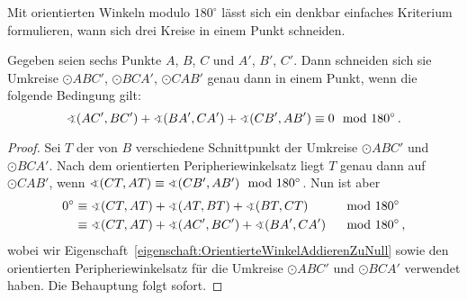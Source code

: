 Mit orientierten Winkeln modulo $180^\circ$ lässt sich ein denkbar einfaches Kriterium formulieren, wann sich drei Kreise in einem Punkt schneiden. %
\begin{satzmitnamen}[Lemma]
	Gegeben seien sechs Punkte $A$, $B$, $C$ und $A'$, $B'$, $C'$. Dann schneiden sich sie Umkreise $\odot ABC'$, $\odot BCA'$, $\odot CAB'$ genau dann in einem Punkt, wenn die folgende Bedingung gilt:
	\begin{equation*}
		\winkel(AC',BC') + \winkel (BA',CA') + \winkel(CB', AB')\equiv 0 \mod 180^\circ\,.
	\end{equation*}
\end{satzmitnamen}

\begin{proof}
	Sei $T$ der von $B$ verschiedene Schnittpunkt der Umkreise $\odot ABC'$ und $\odot BCA'$. Nach dem orientierten Peripheriewinkelsatz liegt $T$ genau dann auf $\odot CAB'$, wenn $\winkel(CT,AT)\equiv\winkel (CB',AB') \mod 180^\circ$. Nun ist aber
	\begin{alignat*}{2}
		0^\circ&\equiv \winkel(CT,AT) +\winkel(AT,BT) + \winkel(BT,CT) &&\mod 180^\circ\\
		&\equiv \winkel(CT,AT) + \winkel(AC',BC') + \winkel(BA',CA') &&\mod 180^\circ\,,
	\end{alignat*}
	wobei wir Eigenschaft~\ref{eigenschaft:OrientierteWinkelAddierenZuNull} sowie den orientierten Peripheriewinkelsatz für die Umkreise $\odot ABC'$ und $\odot BCA'$ verwendet haben. Die Behauptung folgt sofort.
\end{proof}
